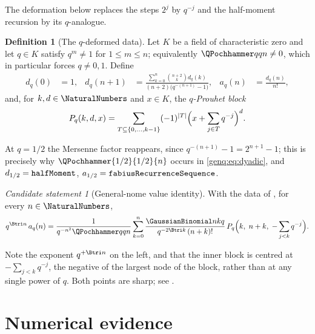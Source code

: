 \documentclass[11pt,oneside]{article}
\theoremstyle{definition}
\newtheorem{definition}[definition]{Definition}
\theoremstyle{remark}
\newtheorem{candidate}[candidate]{Candidate statement}
\newcommand{\lean}[1]{%
  \ifmmode\text{\texttt{\detokenize{#1}}}\else\nolinkurl{#1}\fi}
\begin{document}
The deformation below replaces the steps \(2^{j}\) by \(q^{-j}\) and the
half-moment recursion by its \(q\)-analogue.

\begin{definition}[The \(q\)-deformed data]
\label{genq:def:data}
Let \(K\) be a field of characteristic zero and let \(q\in K\) satisfy
\(q^{m}\neq1\) for \(1\le m\le n\); equivalently
\(\QPochhammer qqn\neq0\), which in particular forces \(q\neq0,1\).  Define
\begin{align}
  d_{q}(0)&=1, &
  d_{q}(n+1)&=\frac{\displaystyle\sum_{k=0}^{n}\binom{n+2}{k}d_{q}(k)}
                  {(n+2)\bigl(q^{-(n+1)}-1\bigr)}, &
  a_{q}(n)&=\frac{d_{q}(n)}{n!},
\end{align}
and, for \(k,d\in\NaturalNumbers\) and \(x\in K\), the \emph{\(q\)-Prouhet
block}
\begin{equation}
\label{genq:eq:block}
  P_{q}(k,d,x)=\sum_{T\subseteq\{0,\dots,k-1\}}(-1)^{\lvert T\rvert}
    \Bigl(x+\sum_{j\in T}q^{-j}\Bigr)^{d}.
\end{equation}
\end{definition}

At \(q=1/2\) the Mersenne factor reappears, since
\(q^{-(n+1)}-1=2^{n+1}-1\); this is precisely why
\(\QPochhammer{1/2}{1/2}{n}\) occurs in \eqref{genq:eq:dyadic}, and
\(d_{1/2}=\lean{halfMoment}\), \(a_{1/2}=\lean{fabiusRecurrenceSequence}\).

\begin{candidate}[General-nome value identity]
\label{genq:cand:main}
With the data of , for every \(n\in\NaturalNumbers\),
\begin{equation}
\label{genq:eq:general}
  q^{\Btri n}\,a_{q}(n)
  =\frac{1}{q^{-n^{2}}\QPochhammer qqn}
   \sum_{k=0}^{n}
     \frac{\GaussianBinomial nkq}{q^{-2\Btri k}\,(n+k)!}\,
     P_{q}\Bigl(k,\;n+k,\;-\sum_{j<k}q^{-j}\Bigr).
\end{equation}
\end{candidate}

Note the exponent \(q^{+\Btri n}\) on the left, and that the inner block is
centred at \(-\sum_{j<k}q^{-j}\), the negative of the largest node of the
block, rather than at any single power of \(q\).  Both points are sharp; see
.

\section{Numerical evidence}
\label{genq:sec:evidence}
\end{document}
